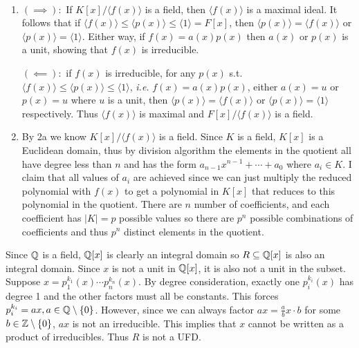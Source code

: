 \documentclass[12pt]{article}
\begin{document}
\begin{problem}[2]
~\begin{enumerate}[label=(\alph*)]
	\item $ (\implies):$ If $ K[x] / \langle f(x) \rangle$ is a field, then $ \langle f(x) \rangle$ is a maximal ideal. It follows that if $ \langle f(x) \rangle \leq \langle p(x) \rangle \leq \langle 1 \rangle = F[x]$, then $ \langle p(x) \rangle = \langle f(x) \rangle$ or $ \langle p(x) \rangle = \langle 1 \rangle$. Either way, if $ f(x)=a(x)p(x)$ then $ a(x)$ or  $ p(x)$ is a unit, showing that  $ f(x)$ is irreducible.

		$ (\impliedby):$ if $ f(x)$ is irreducible, for any  $ p(x)$  s.t.\ $ \langle f(x) \rangle \leq \langle p(x) \rangle \leq \langle 1 \rangle$, \emph{i.e.} $ f(x) = a(x)p(x)$, either  $ a(x) =u$ or  $ p(x) = u$ where  $ u$ is a unit, then  $ \langle p(x) \rangle = \langle f(x) \rangle$ or $ \langle p(x) \rangle = \langle 1 \rangle$ respectively. Thus $ \langle f(x) \rangle$ is maximal and $ F[x] / \langle f(x) \rangle$ is a field.
	\item By 2a we know $ K[x] / \langle f(x) \rangle$ is a field. Since $ K$ is a field,  $ K[x]$ is a Euclidean domain, thus by division algorithm the elements in the quotient all have degree less than $ n$ and has the form $ a_{n-1} x^{n-1} + \cdots +a_0$ where $ a_i \in K$. I claim that all values of $ a_i$ are achieved since we can just multiply the reduced polynomial with $ f(x)$ to get a polynomial in  $ K[x]$ that reduces to this polynomial in the quotient. There are $ n$ number of coefficients, and each coefficient has  $|K|= p$ possible values so there are  $ p^{n}$ possible combinations of coefficients and thus $ p^{n}$ distinct elements in the quotient.
\end{enumerate}
\end{problem}
\begin{problem}[3]
	Since $ \mathbb{Q}$ is a field, $ \mathbb{Q}[x]$ is clearly an integral domain so $ R \subseteq \mathbb{Q}[x]$ is also an integral domain. Since $ x$ is not a unit in  $ \mathbb{Q}[x]$, it is also not a unit in the subset. Suppose  $ x = p_1^{k_1}(x) \cdots p_n^{k_n}(x)$. By degree consideration, exactly one $ p_i^{k_i}(x)$ has degree 1 and the other factors must all be constants. This forces $ p_i^{k_i} = ax, a \in \mathbb{Q} \setminus \{0\} $. However, since we can always factor $ ax = \frac{a}{b}x \cdot b$ for some $ b \in \mathbb{Z}\setminus \{0\} $, $ ax$ is not an irreducible. This implies that $ x$ cannot be written as a product of irreducibles. Thus $ R$ is not a UFD.
\end{problem}
\end{document}
